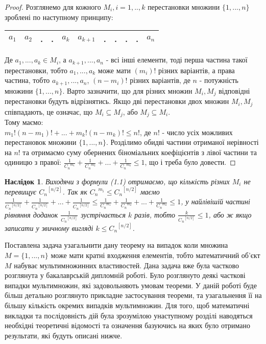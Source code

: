\begin{proof}
Розглянемо для кожного $ M_i, i=1,..,k $ перестановки множини $ \{1,...,n\} $ зроблені по наступному принципу:

\begin{center}
\begin{tabular}{ |c|c|c|c|c|c|c|c|c|c|c| } 
 \hline
 $a_1$ & $a_2$ & . & . & $a_k$ & $a_{k+1}$ & . & . & . & . & $a_n$ \\
 \hline
\end{tabular}
\end{center}

Де $ a_1,...,a_k \in M_i $, а $ a_{k+1},...,a_n $ - всі інші елементи, тоді перша частина такої перестановки, тобто  $ a_1,...,a_k$ може мати $ (m_i)! $ різних варіантів, а права частина, тобто $ a_{k+1},...,a_n $, $ (n-m_i)!$ різних варіантів, де $n$ - потужність множини $ \{1,...,n\} $. Варто зазначити, що для різних множин $ M_i, M_j $ відповідні перестановки будуть відрізнятись. Якщо дві перестановки двох множин  $ M_i, M_j $ співпадають, це означає, що $ M_i \subseteq M_j $, або $ M_j \subseteq M_i $.
\\
Тому маємо:
\\
$m_1!(n-m_1)! + ... + m_k!(n-m_k)! \leq n! $, де $ n! $ - число усіх можливих перестановок множини $ \{1,...,n\} $. Розділимо обидві частини отриманої нерівності на $ n! $ та отримаємо суму обернених біноміальних коефіцієнтів з лівої частини та одиницю з правої: $\frac{1}{{C_n}^{m_1}} + \frac{1}{{C_n}^{m_2}} + ... + \frac{1}{{C_n}^{m_k}} \leq 1$, що і треба було довести.
\end{proof}

\newtheorem{corollary}{Наслідок}[condition1]
\begin{corollary}
Виходячи з формули (1.1) отримаємо, що кількість різних $ M_i $ не перевищує ${C_n}^{[n/2]}$. Так як ${C_n}^{m_i} \leq {C_n}^{[n/2]}$  маємо  $ \frac{1}{{C_n}^{[n/2]}} + \frac{1}{{C_n}^{[n/2]}} + ... + \frac{1}{{C_n}^{[n/2]}}   \leq \frac{1}{{C_n}^{m_1}} + \frac{1}{{C_n}^{m_2}} + ... + \frac{1}{{C_n}^{m_k}} \leq 1$, у найлівішій частині рівняння доданок $\frac{1}{{C_n}^{[n/2]}}$ зустрічається $k$ разів, тобто $\frac{k}{{C_n}^{[n/2]}} \leq 1$, або ж якщо записати у звичному вигляді $k \leq {C_n}^{[n/2]}$.
\end{corollary}

\par Поставлена задача узагальнити дану теорему на випадок коли множина $ M = \{1,...,n\} $ може мати кратні входження елементів, тобто математичний об'єкт $ M $ набуває мультимножинних властивостей. Дана задача вже була частково розглянута у бакалаврській дипломній роботі. Було розглянуто деякі часткові випадки мультимножин, які задовольняють умовам теореми. У даній роботі буде більш детально розглянуто прикладне застосування теореми, та узагальнення її на більшу кількість окремих випадків мультимножин. Для того, щоб математичні викладки та послідовність дій була зрозумілою унаступному розділі наводяться необхідні теоретичні відомості та означення базуючись на яких було отримано результати, які будуть описані нижче.

